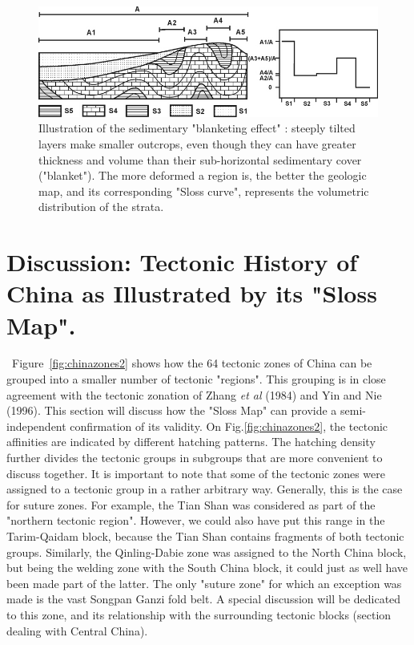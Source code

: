 \documentclass{article}
\begin{document}
 \begin{figure}[here]
 \begin{center}
 \includegraphics[width=1\textwidth]{problems1.jpg}
 \caption[fig:problems1]{Illustration of the sedimentary 
 "blanketing effect"  : steeply  tilted layers make  smaller outcrops,
 even though  they can  have greater thickness  and volume  than their
 sub-horizontal  sedimentary cover  ("blanket"). The  more  deformed a
 region is, the better the  geologic map, and its corresponding "Sloss
 curve",    represents   the    volumetric    distribution   of    the
 strata. }\label{fig:problems1}
 \end{center}
 \end{figure}

 \section*{Discussion: Tectonic History of China as Illustrated by its 
 "Sloss Map".} \label{sec:discussion}

 ~\indent Figure~\ref{fig:chinazones2} shows  how the 64 tectonic zones
 of  China  can   be  grouped  into  a  smaller   number  of  tectonic
 "regions".  This grouping  is in  close agreement  with  the tectonic
 zonation of  Zhang {\it et  al} (1984) and  Yin and Nie  (1996). This
 section   will  discuss   how   the  "Sloss   Map"   can  provide   a
 semi-independent     confirmation     of     its    validity.      On
 Fig.\ref{fig:chinazones2}, the  tectonic affinities are  indicated by
 different  hatching patterns.  The  hatching density  further divides
 the tectonic groups in subgroups  that are more convenient to discuss
 together.  It  is important to note  that some of  the tectonic zones
 were  assigned  to  a  tectonic  group in  a  rather  arbitrary  way.
 Generally, this is  the case for suture zones.  For example, the Tian
 Shan  was  considered as  part  of  the  "northern tectonic  region".
 However, we could also have put this range in the Tarim-Qaidam block,
 because  the Tian Shan  contains fragments  of both  tectonic groups.
 Similarly,  the Qinling-Dabie zone  was assigned  to the  North China
 block,  but being the  welding zone  with the  South China  block, it
 could  just as  well have  been made  part of  the latter.   The only
 "suture zone"  for which  an exception was  made is the  vast Songpan
 Ganzi  fold belt.   A special  discussion will  be dedicated  to this
 zone,  and  its relationship  with  the  surrounding tectonic  blocks
 (section dealing with Central China).
\end{document}
